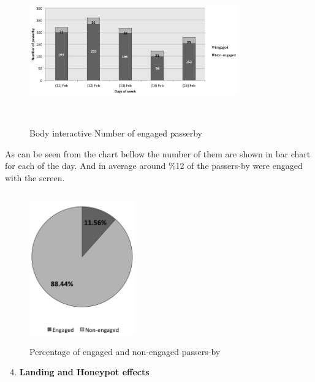 \begin{enumerate}
\begin{figure}[H]
    \centering
    \includegraphics[width=0.8\textwidth,height=6.5cm]{Figures/8/body_inter_findings/body_inter_engage_day}
    \caption{Body interactive Number of engaged passerby}%
    \label{fig:bodyengagedandengagedby}%
\end{figure}

As can be seen from the chart bellow the number of them are shown in bar chart for each of the day. And in average around \%12 of the passers-by were engaged with the screen. 

\begin{figure}[H]
    \centering
    \includegraphics[width=0.4\textwidth,height=6.5cm]{Figures/8/body_inter_findings/body_eng_percentage}
    \caption{Percentage of engaged and non-engaged passers-by}%
    \label{fig:bodyengagedpasserbypercentage}%
\end{figure}


\end{enumerate}


\newpage
\begin{enumerate}
\setcounter{enumi}{3}
\item \textbf{Landing and Honeypot effects}
\end{enumerate}

